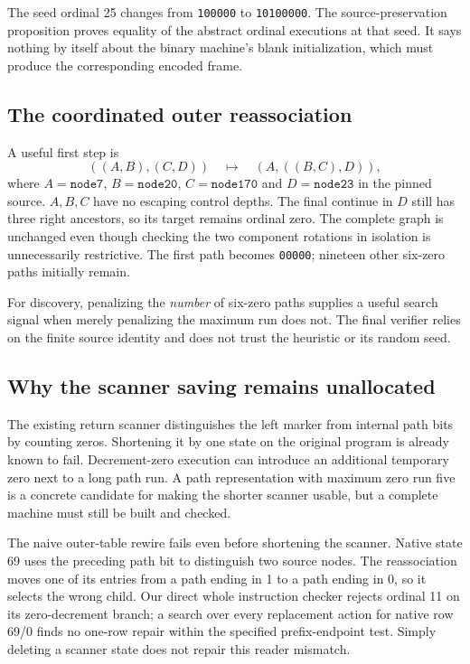 \documentclass[11pt,letterpaper]{article}
\begin{document}
The seed ordinal 25 changes from \texttt{100000} to \texttt{10100000}.
The source-preservation proposition proves equality of the abstract ordinal
executions at that seed. It says nothing by itself about the binary machine's
blank initialization, which must produce the corresponding encoded frame.

\subsection{The coordinated outer reassociation}

A useful first step is
\[
 ((A,B),(C,D))\quad\longmapsto\quad(A,((B,C),D)),
\]
where $A=\mathtt{node7}$, $B=\mathtt{node20}$,
$C=\mathtt{node170}$ and $D=\mathtt{node23}$ in the pinned source.
$A,B,C$ have no escaping control depths. The final continue in $D$ still
has three right ancestors, so its target remains ordinal zero. The complete
graph is unchanged even though checking the two component rotations in
isolation is unnecessarily restrictive. The first path becomes
\texttt{00000}; nineteen other six-zero paths initially remain.

For discovery, penalizing the \emph{number} of six-zero paths supplies a
useful search signal when merely penalizing the maximum run does not.
The final verifier relies on the finite source identity and does not trust
the heuristic or its random seed.

\subsection{Why the scanner saving remains unallocated}

The existing return scanner distinguishes the left marker from internal
path bits by counting zeros. Shortening it by one state on the original
program is already known to fail. Decrement-zero execution can introduce
an additional temporary zero next to a long path run. A path representation
with maximum zero run five is a concrete candidate for making the shorter
scanner usable, but a complete machine must still be built and checked.

The naive outer-table rewire fails even before shortening the scanner.
Native state 69 uses the preceding path bit to distinguish two source
nodes. The reassociation moves one of its entries from a path ending in
1 to a path ending in 0, so it selects the wrong child. Our direct whole
instruction checker rejects ordinal 11 on its zero-decrement branch; a search
over every replacement action for native row 69/0 finds no one-row repair
within the specified prefix-endpoint test. Simply deleting a scanner state
does not repair this reader mismatch.
\end{document}
